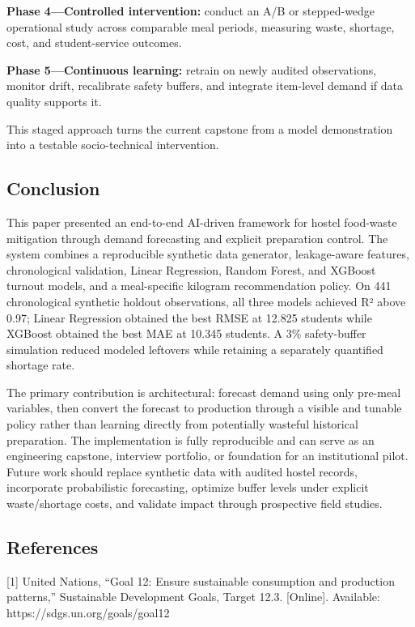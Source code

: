 \documentclass[conference]{IEEEtran}
\begin{document}
\textbf{Phase 4---Controlled intervention:} conduct an A/B or
stepped-wedge operational study across comparable meal periods,
measuring waste, shortage, cost, and student-service outcomes.

\textbf{Phase 5---Continuous learning:} retrain on newly audited
observations, monitor drift, recalibrate safety buffers, and integrate
item-level demand if data quality supports it.

This staged approach turns the current capstone from a model
demonstration into a testable socio-technical intervention.

\subsection{Conclusion}\label{conclusion}

This paper presented an end-to-end AI-driven framework for hostel
food-waste mitigation through demand forecasting and explicit
preparation control. The system combines a reproducible synthetic data
generator, leakage-aware features, chronological validation, Linear
Regression, Random Forest, and XGBoost turnout models, and a
meal-specific kilogram recommendation policy. On 441 chronological
synthetic holdout observations, all three models achieved R² above 0.97;
Linear Regression obtained the best RMSE at 12.825 students while
XGBoost obtained the best MAE at 10.345 students. A 3\% safety-buffer
simulation reduced modeled leftovers while retaining a separately
quantified shortage rate.

The primary contribution is architectural: forecast demand using only
pre-meal variables, then convert the forecast to production through a
visible and tunable policy rather than learning directly from
potentially wasteful historical preparation. The implementation is fully
reproducible and can serve as an engineering capstone, interview
portfolio, or foundation for an institutional pilot. Future work should
replace synthetic data with audited hostel records, incorporate
probabilistic forecasting, optimize buffer levels under explicit
waste/shortage costs, and validate impact through prospective field
studies.

\subsection{References}\label{references}

{[}1{]} United Nations, ``Goal 12: Ensure sustainable consumption and
production patterns,'' Sustainable Development Goals, Target 12.3.
{[}Online{]}. Available: https://sdgs.un.org/goals/goal12
\end{document}

